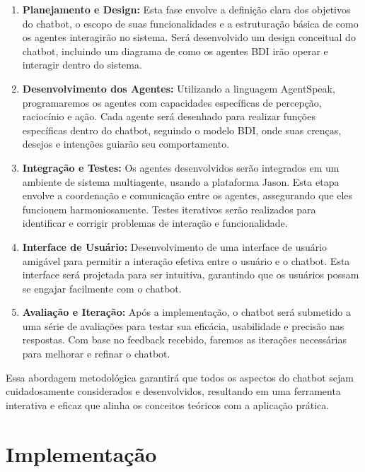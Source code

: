 \documentclass[12pt]{article}
\begin{document}
    \begin{enumerate}
    \item \textbf{Planejamento e Design:} Esta fase envolve a definição clara dos objetivos do chatbot, o escopo de suas funcionalidades e a estruturação básica de como os agentes interagirão no sistema. Será desenvolvido um design conceitual do chatbot, incluindo um diagrama de como os agentes BDI irão operar e interagir dentro do sistema.

        \item \textbf{Desenvolvimento dos Agentes:} Utilizando a linguagem AgentSpeak, programaremos os agentes com capacidades específicas de percepção, raciocínio e ação. Cada agente será desenhado para realizar funções específicas dentro do chatbot, seguindo o modelo BDI, onde suas crenças, desejos e intenções guiarão seu comportamento.

        \item \textbf{Integração e Testes:} Os agentes desenvolvidos serão integrados em um ambiente de sistema multiagente, usando a plataforma Jason. Esta etapa envolve a coordenação e comunicação entre os agentes, assegurando que eles funcionem harmoniosamente. Testes iterativos serão realizados para identificar e corrigir problemas de interação e funcionalidade.

        \item \textbf{Interface de Usuário:} Desenvolvimento de uma interface de usuário amigável para permitir a interação efetiva entre o usuário e o chatbot. Esta interface será projetada para ser intuitiva, garantindo que os usuários possam se engajar facilmente com o chatbot.

        \item \textbf{Avaliação e Iteração:} Após a implementação, o chatbot será submetido a uma série de avaliações para testar sua eficácia, usabilidade e precisão nas respostas. Com base no feedback recebido, faremos as iterações necessárias para melhorar e refinar o chatbot.

    \end{enumerate}

    Essa abordagem metodológica garantirá que todos os aspectos do chatbot sejam cuidadosamente considerados e desenvolvidos, resultando em uma ferramenta interativa e eficaz que alinha os conceitos teóricos com a aplicação prática.



    \section{Implementação}
\end{document}
